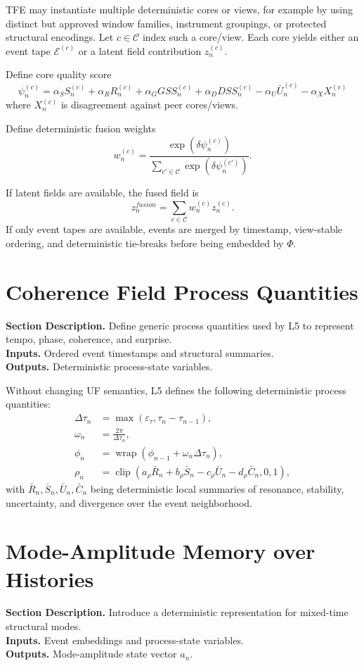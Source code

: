\documentclass[11pt]{report}
\newcommand{\clip}{\operatorname{clip}}
\newcommand{\wrap}{\operatorname{wrap}}
\newcommand{\E}{\mathcal{E}}
\newcommand{\meta}[3]{\textbf{Section Description.} #1\\
\textbf{Inputs.} #2\\
\textbf{Outputs.} #3\par}
\begin{document}
TFE may instantiate multiple deterministic cores or views, for example by using distinct but approved window families, instrument groupings, or protected structural encodings. Let $c\in\mathcal{C}$ index such a core/view. Each core yields either an event tape $\E^{(c)}$ or a latent field contribution $z_n^{(c)}$.

Define core quality score
\[
\psi_n^{(c)} = \alpha_S S_n^{(c)} + \alpha_R R_n^{(c)} + \alpha_G GSS_n^{(c)} + \alpha_D DSS_n^{(c)} - \alpha_U \bar U_n^{(c)} - \alpha_X X_n^{(c)}
\]
where $X_n^{(c)}$ is disagreement against peer cores/views.

Define deterministic fusion weights
\[
w_n^{(c)} = \frac{\exp(\delta\psi_n^{(c)})}{\sum_{c'\in\mathcal{C}}\exp(\delta\psi_n^{(c')})}.
\]

If latent fields are available, the fused field is
\[
z_n^{fusion}=\sum_{c\in\mathcal{C}} w_n^{(c)} z_n^{(c)}.
\]
If only event tapes are available, events are merged by timestamp, view-stable ordering, and deterministic tie-breaks before being embedded by $\Phi$.

\section{Coherence Field Process Quantities}
\meta{Define generic process quantities used by L5 to represent tempo, phase, coherence, and surprise.}{Ordered event timestamps and structural summaries.}{Deterministic process-state variables.}

Without changing UF semantics, L5 defines the following deterministic process quantities:
\begin{align*}
\Delta\tau_n &= \max(\varepsilon_\tau,\tau_n-\tau_{n-1}),\\
\omega_n &= \frac{2\pi}{\Delta\tau_n},\\
\phi_n &= \wrap(\phi_{n-1}+\omega_n\Delta\tau_n),\\
\rho_n &= \clip\left(a_\rho\bar R_n+b_\rho\bar S_n-c_\rho\bar U_n-d_\rho\bar C_n,0,1\right),
\end{align*}
with $\bar R_n,\bar S_n,\bar U_n,\bar C_n$ being deterministic local summaries of resonance, stability, uncertainty, and divergence over the event neighborhood.

\section{Mode-Amplitude Memory over Histories}
\meta{Introduce a deterministic representation for mixed-time structural modes.}{Event embeddings and process-state variables.}{Mode-amplitude state vector $a_n$.}
\end{document}
